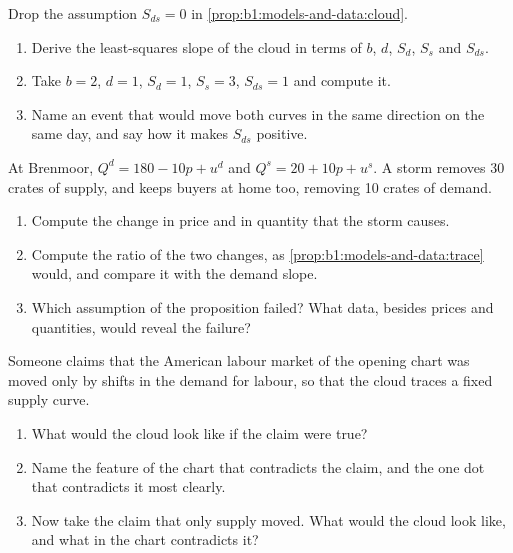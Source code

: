 \begin{exercise}[$\star\star\star$]\label{exo:b1:models-and-data:cross}
Drop the assumption $S_{ds} = 0$ in \cref{prop:b1:models-and-data:cloud}.
\begin{enumerate}
  \item Derive the least-squares slope of the cloud in terms of $b$, $d$, $S_d$, $S_s$ and $S_{ds}$.
  \item Take $b = 2$, $d = 1$, $S_d = 1$, $S_s = 3$, $S_{ds} = 1$ and compute it.
  \item Name an event that would move both curves in the same direction on the same day, and say how it makes $S_{ds}$ positive.
\end{enumerate}
\end{exercise}

\begin{exercise}[$\star\star\star$]\label{exo:b1:models-and-data:bad-shifter}
At Brenmoor, $Q^d = 180 - 10p + u^d$ and $Q^s = 20 + 10p + u^s$. A storm
removes 30 crates of supply, and keeps buyers at home too, removing 10
crates of demand.
\begin{enumerate}
  \item Compute the change in price and in quantity that the storm causes.
  \item Compute the ratio of the two changes, as \cref{prop:b1:models-and-data:trace} would, and compare it with the demand slope.
  \item Which assumption of the proposition failed? What data, besides prices and quantities, would reveal the failure?
\end{enumerate}
\end{exercise}

\begin{exercise}[$\star\star\star$]\label{exo:b1:models-and-data:falsify}
Someone claims that the American labour market of the opening chart was
moved only by shifts in the demand for labour, so that the cloud traces a
fixed supply curve.
\begin{enumerate}
  \item What would the cloud look like if the claim were true?
  \item Name the feature of the chart that contradicts the claim, and the
    one dot that contradicts it most clearly.
  \item Now take the claim that only supply moved. What would the cloud
    look like, and what in the chart contradicts it?
\end{enumerate}
\end{exercise}

